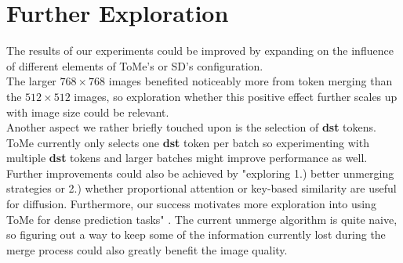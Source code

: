 \section{Further Exploration}
The results of our experiments could be improved by expanding on the influence of different elements of ToMe's or SD's configuration.\\ 
The larger $768 \times 768$ images benefited noticeably more from token merging than the $512 \times 512$ images, so exploration whether this positive effect further scales up with image size could be relevant.\\
Another aspect we rather briefly touched upon is the selection of \textbf{dst} tokens. ToMe currently only selects one \textbf{dst} token per batch so experimenting with multiple \textbf{dst} tokens and larger batches might improve performance as well.\\ 
Further improvements could also be achieved by "exploring 1.) better unmerging strategies or 2.) whether proportional attention or key-based similarity are useful for diffusion. Furthermore, our success motivates more exploration into using ToMe for dense prediction tasks" \cite{bolya2023tomesd}.
The current unmerge algorithm is quite naive, so figuring out a way to keep some of the information currently lost during the merge process could also greatly benefit the image quality.\\
